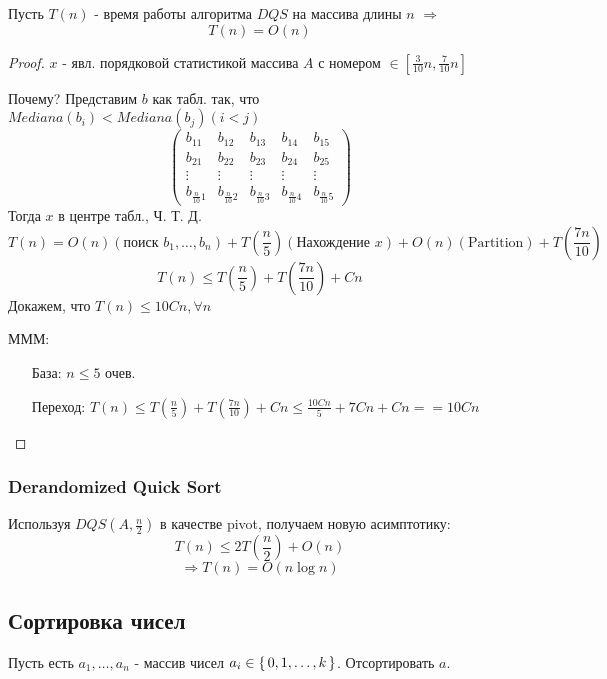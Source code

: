 \begin{statement}
Пусть $T(n)$ - время работы алгоритма $DQS$ на массива длины $n$ $\Rightarrow$
\[
T(n) = O(n)
\] 
\end{statement}
\begin{proof}
  $x$ - явл. порядковой статистикой массива $A$ с номером $\in [\frac{3}{10}n, \frac{7}{10}n]$
  
  Почему? Представим $b$ как табл. так, что $Mediana(b_i) < Mediana(b_j) (i < j)$
\[
  \begin{pmatrix}b_{11} & b_{12} & b_{13} & b_{14} & b_{15} \\
  b_{21} & b_{22} & b_{23} & b_{24} & b_{25} \\
\vdots & \vdots & \vdots & \vdots & \vdots \\
b_{\frac{n}{10}1} &b_{\frac{n}{10}2} & b_{\frac{n}{10}3} & b_{\frac{n}{10}4} & b_{\frac{n}{10}5}\end{pmatrix}
\] 
Тогда $x$ в центре табл., Ч. Т. Д.
\[
T(n) = O(n) (\text{поиск $b_1, \ldots , b_n$}) + T(\frac{n}{5})(\text{Нахождение $x$}) + O(n)(\text{Partition}) + T(\frac{7n}{10})
\] 
\[
T(n) \leq T(\frac{n}{5}) + T(\frac{7n}{10}) + Cn
\] 
Докажем, что $T(n) \leq 10Cn, \forall n$

МММ:
\begin{itemize}
  \item [База: ] $n \leq 5$ очев.
  \item [Переход: ] $T(n) \leq T(\frac{n}{5}) + T(\frac{7n}{10}) + Cn \leq \frac{10Cn}{5} + 7Cn + Cn == 10Cn $
\end{itemize}
\end{proof} 

\subsubsection{Derandomized Quick Sort}

Используя $DQS(A, \frac{n}{2})$ в качестве pivot, получаем новую асимптотику:
\[
T(n) \leq 2T(\frac{n}{2}) + O(n)
\] 
\[
\Rightarrow T(n) = O(n\log n)
\] 
\subsection{Сортировка чисел}

\begin{task}
Пусть есть $a_1, \ldots, a_n$ - массив чисел $a_i \in \set{0, 1,\ldots, k} $. Отсортировать $a$.
\end{task}

